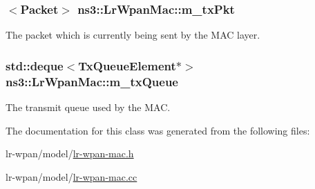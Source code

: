 \subsubsection[{\texorpdfstring{m\+\_\+tx\+Pkt}{m_txPkt}}]{$<${\bf Packet}$>$ ns3\+::\+Lr\+Wpan\+Mac\+::m\+\_\+tx\+Pkt\hspace{0.3cm}{\ttfamily [private]}}\hypertarget{classns3_1_1LrWpanMac_aca93e7c7a2128818f2861a48751442ca}{}\label{classns3_1_1LrWpanMac_aca93e7c7a2128818f2861a48751442ca}
The packet which is currently being sent by the M\+AC layer. 
\subsubsection[{\texorpdfstring{m\+\_\+tx\+Queue}{m_txQueue}}]{\setlength{\rightskip}{0pt plus 5cm}std\+::deque$<${\bf Tx\+Queue\+Element}$\ast$$>$ ns3\+::\+Lr\+Wpan\+Mac\+::m\+\_\+tx\+Queue\hspace{0.3cm}{\ttfamily [private]}}\hypertarget{classns3_1_1LrWpanMac_a90ea1fb2b1cec84e8ca2177772a1644d}{}\label{classns3_1_1LrWpanMac_a90ea1fb2b1cec84e8ca2177772a1644d}
The transmit queue used by the M\+AC. 

The documentation for this class was generated from the following files\+:\begin{DoxyCompactItemize}
\item 
lr-\/wpan/model/\hyperlink{lr-wpan-mac_8h}{lr-\/wpan-\/mac.\+h}\item 
lr-\/wpan/model/\hyperlink{lr-wpan-mac_8cc}{lr-\/wpan-\/mac.\+cc}\end{DoxyCompactItemize}
